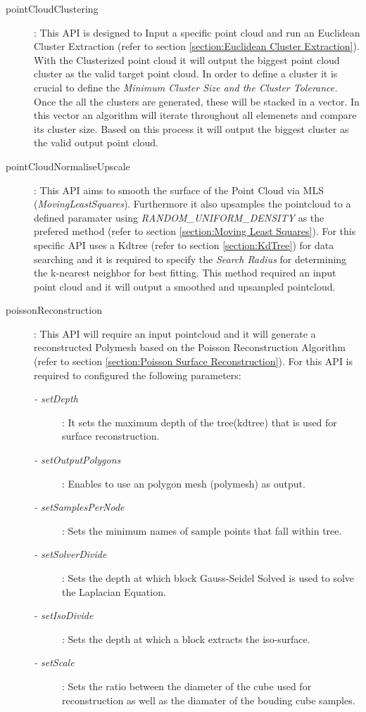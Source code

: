 \documentclass[12pt]{report}
\begin{document}
\begin{description}
  \item[pointCloudClustering]: This API is designed to Input a specific point cloud and run an Euclidean Cluster Extraction (refer to section \ref{section:Euclidean Cluster Extraction}). With the Clusterized point cloud it will output the biggest point cloud cluster as the valid  target point cloud.
   In order to define a cluster it is crucial to define the \textit{Minimum Cluster Size and the Cluster Tolerance.} Once the all the clusters are generated, these will be stacked in a vector. 
   In this vector an algorithm will iterate  throughout all elemenets and compare its cluster size. Based on this process it will output the biggest cluster as the valid output point cloud.
   \item[pointCloudNormaliseUpscale]: This API aims to smooth the surface of the Point Cloud via MLS (\textit{MovingLeastSquares}). 
   Furthermore it also upsamples the pointcloud to a defined paramater using \textit{RANDOM\_UNIFORM\_DENSITY} as the prefered method (refer to section \ref{section:Moving Least Squares}). 
   For this specific API uses a Kdtree (refer to section \ref{section:KdTree}) for data searching and it is required to specify the \textit{Search Radius} for determining the k-nearest neighbor for best fitting. 
   This method required an input point cloud and it will output a smoothed and upsampled pointcloud.
   \item[poissonReconstruction]: This API will require an input pointcloud and it will generate a reconstructed Polymesh based on the Poisson Reconstruction Algorithm (refer to section \ref{section:Poisson Surface Reconstruction}).
   For this API is required to configured the following parameters:
   \begin{description}
     \item[\textit{- setDepth}]: It sets the maximum depth of the tree(kdtree) that is used for surface reconstruction. 
     \item[\textit{- setOutputPolygons}] : Enables to use an polygon mesh (polymesh) as output.
     \item[\textit{- setSamplesPerNode}] : Sets the minimum names of sample points that fall within tree.
     \item[\textit{- setSolverDivide}] : Sets the depth at which block Gauss-Seidel Solved is used to solve the Laplacian Equation.
     \item[\textit{- setIsoDivide}] : Sets the depth at which a block extracts the iso-surface.
     \item[\textit{- setScale}] : Sets the ratio between the diameter of the cube used for reconstruction as well as the diamater of the bouding cube samples.
   \end{description}


\end{description}
\end{document}
